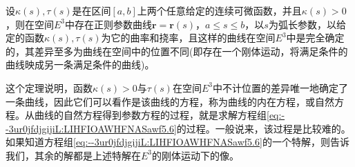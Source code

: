 \documentclass[../../main.tex]{subfiles}%
\begin{document}
\begin{theorem}[曲线论基本定理]\label{theorem:微分几何-曲线论基本定理}
设$\kappa(s),\tau(s)$是在区间$[a,b]$上两个任意给定的连续可微函数，并且$\kappa(s) > 0$，则在空间$E^3$中存在正则参数曲线$\bm{r} = \bm{r}(s)$，$a \leqslant s \leqslant b$，以$s$为弧长参数，以给定的函数$\kappa(s),\tau(s)$为它的曲率和挠率，且这样的曲线在空间$E^3$中是完全确定的，其差异至多为曲线在空间中的位置不同(即存在一个刚体运动，将满足条件的曲线映成另一条满足条件的曲线)。
\end{theorem}
\begin{remark}
这个定理说明，函数$\kappa(s) > 0$与$\tau(s)$在空间$E^3$中不计位置的差异唯一地确定了一条曲线，因此它们可以看作是该曲线的方程，称为曲线的内在方程，或自然方程。从曲线的自然方程得到参数方程的过程，就是求解方程组\eqref{eq:--3ur0jfdjgijiL:LIHFIOAWHFNASawf5.6}的过程。一般说来，该过程是比较难的。如果知道方程组\eqref{eq:--3ur0jfdjgijiL:LIHFIOAWHFNASawf5.6}的一个特解，则告诉我们，其余的解都是上述特解在$E^3$的刚体运动下的像。
\end{remark}
\end{document}
